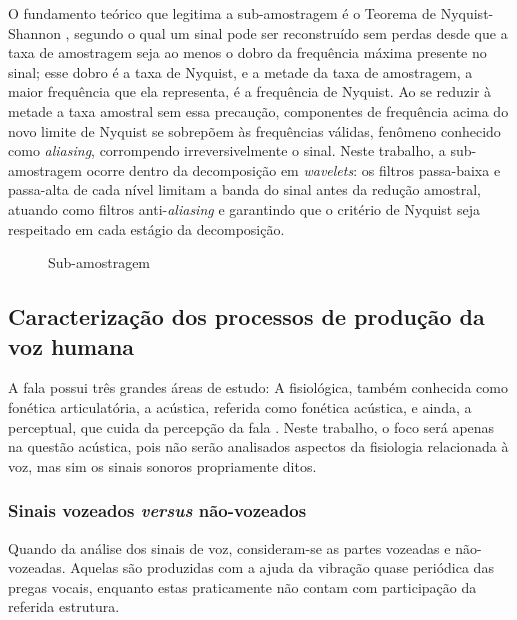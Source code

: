 			\par O fundamento teórico que legitima a sub-amostragem é o Teorema de Nyquist-Shannon \cite{haykin2011sistemas}, segundo o qual um sinal pode ser reconstruído sem perdas desde que a taxa de amostragem seja ao menos o dobro da frequência máxima presente no sinal; esse dobro é a taxa de Nyquist, e a metade da taxa de amostragem, a maior frequência que ela representa, é a frequência de Nyquist. Ao se reduzir à metade a taxa amostral sem essa precaução, componentes de frequência acima do novo limite de Nyquist se sobrepõem às frequências válidas, fenômeno conhecido como \textit{aliasing}, corrompendo irreversivelmente o sinal. Neste trabalho, a sub-amostragem ocorre dentro da decomposição em \textit{wavelets}: os filtros passa-baixa e passa-alta de cada nível limitam a banda do sinal antes da redução amostral, atuando como filtros anti-\textit{aliasing} e garantindo que o critério de Nyquist seja respeitado em cada estágio da decomposição. 
			\begin{figure}[h]
				\centering
				\caption{Sub-amostragem}
				
				\label{fig:downsampling}
			\end{figure}
	
		\subsection{Caracterização dos processos de produção da voz humana}
			\par A fala possui três grandes áreas de estudo: A fisiológica, também conhecida como fonética articulatória, a acústica, referida como fonética acústica, e ainda, a perceptual, que cuida da percepção  da  fala \cite{kremer2014eficiencia}. Neste trabalho, o foco será apenas na questão acústica, pois não serão analisados aspectos da fisiologia relacionada à voz, mas sim os sinais sonoros propriamente ditos.
		
		\subsubsection{Sinais vozeados \textit{versus} não-vozeados}
			\par Quando da análise dos sinais de voz, consideram-se as partes vozeadas e não-vozeadas. Aquelas são produzidas com a ajuda da vibração quase periódica das pregas vocais, enquanto estas praticamente não contam com participação da referida estrutura.
		
